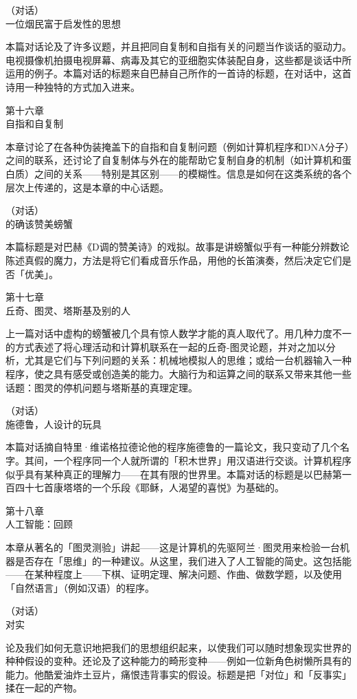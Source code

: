 \documentclass[
  12pt,
  twoside,
  openright,
  oldfontcommands,
]{memoir}
\begin{document}
（对话）\\
{一位烟民富于启发性的思想}

本篇对话论及了许多议题，并且把同自复制和自指有关的问题当作谈话的驱动力。电视摄像机拍摄电视屏幕、病毒及其它的亚细胞实体装配自身，这些都是谈话中所运用的例子。本篇对话的标题来自巴赫自己所作的一首诗的标题，在对话中，这首诗用一种独特的方式加入进来。

第十六章\\
{自指和自复制}

本章讨论了在各种伪装掩盖下的自指和自复制问题（例如计算机程序和DNA分子）之间的联系，还讨论了自复制体与外在的能帮助它复制自身的机制（如计算机和蛋白质）之间的关系------特别是其区别------的模糊性。信息是如何在这类系统的各个层次上传递的，这是本章的中心话题。

（对话）\\
{的确该赞美螃蟹}

本篇标题是对巴赫《D调的赞美诗》的戏拟。故事是讲螃蟹似乎有一种能分辨数论陈述真假的魔力，方法是将它们看成音乐作品，用他的长笛演奏，然后决定它们是否「优美」。

第十七章\\
{丘奇、图灵、塔斯基及别的人}

上一篇对话中虚构的螃蟹被几个具有惊人数学才能的真人取代了。用几种力度不一的方式表述了将心理活动和计算机联系在一起的丘奇-图灵论题，并对之加以分析，尤其是它们与下列问题的关系：机械地模拟人的思维；或给一台机器输入一种程序，使之具有感受或创造美的能力。大脑行为和运算之间的联系又带来其他一些话题：图灵的停机问题与塔斯基的真理定理。

（对话）\\
{施德鲁，人设计的玩具}

本篇对话摘自特里·维诺格拉德论他的程序施德鲁的一篇论文，我只变动了几个名字。其间，一个程序同一个人就所谓的「积木世界」用汉语进行交谈。计算机程序似乎具有某种真正的理解力------在其有限的世界里。本篇对话的标题是以巴赫第一百四十七首康塔塔的一个乐段《耶稣，人渴望的喜悦》为基础的。

第十八章\\
{人工智能：回顾}

本章从著名的「图灵测验」讲起------这是计算机的先驱阿兰·图灵用来检验一台机器是否存在「思维」的一种建议。从这里，我们进入了人工智能的简史。这包括能------在某种程度上------下棋、证明定理、解决问题、作曲、做数学题，以及使用「自然语言」（例如汉语）的程序。

（对话）\\
{对实}

论及我们如何无意识地把我们的思想组织起来，以使我们可以随时想象现实世界的种种假设的变种。还论及了这种能力的畸形变种------例如一位新角色树懒所具有的能力。他酷爱油炸土豆片，痛恨违背事实的假设。标题是把「对位」和「反事实」揉在一起的产物。
\end{document}
